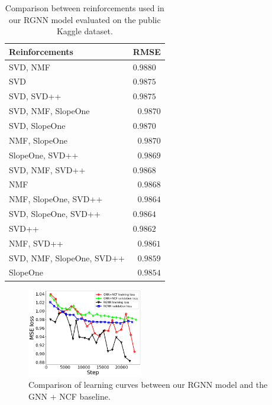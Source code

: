 \begin{table}[]
\centering
\begin{tabular}{ll}
\hline
Reinforcements & RMSE \\ \hline
SVD, NMF & $0.9880$ \\
SVD & $0.9875$ \\
SVD, SVD++ & $0.9875$ \\
SVD, NMF, SlopeOne & \multicolumn{1}{r}{$0.9870$} \\
SVD, SlopeOne & $0.9870$ \\
NMF, SlopeOne & \multicolumn{1}{r}{$0.9870$} \\
SlopeOne, SVD++ & \multicolumn{1}{r}{$0.9869$} \\
SVD, NMF, SVD++ & $0.9868$ \\
NMF & \multicolumn{1}{r}{$0.9868$} \\
NMF, SlopeOne, SVD++ & \multicolumn{1}{r}{$0.9864$} \\
SVD, SlopeOne, SVD++ & $0.9864$ \\
SVD++ & $0.9862$ \\
NMF, SVD++ & \multicolumn{1}{r}{$0.9861$} \\
SVD, NMF, SlopeOne, SVD++ & \multicolumn{1}{r}{$0.9859$} \\
SlopeOne & \multicolumn{1}{r}{\boldmath$0.9854$} \\  \hline
\end{tabular}
\caption{Comparison between reinforcements used in our RGNN model evaluated on the public Kaggle dataset.}
\label{tab:results_rgnn}
\end{table}

\begin{figure}
    \centering
    \includegraphics[width=0.45\textwidth]{figures/learning_curve.png}
    \caption{Comparison of learning curves between our RGNN model and the GNN + NCF baseline.}
    \label{fig:learning_curve_comparison}
\end{figure}